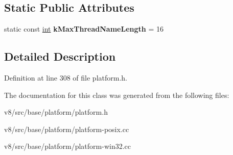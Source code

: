 \subsection*{Static Public Attributes}
\begin{DoxyCompactItemize}
\item 
\mbox{\label{classv8_1_1base_1_1Thread_add5f4a186f3af7d6781fb36847309e7e}} 
static const \mbox{\hyperlink{classint}{int}} {\bfseries k\+Max\+Thread\+Name\+Length} = 16
\end{DoxyCompactItemize}


\subsection{Detailed Description}


Definition at line 308 of file platform.\+h.



The documentation for this class was generated from the following files\+:\begin{DoxyCompactItemize}
\item 
v8/src/base/platform/platform.\+h\item 
v8/src/base/platform/platform-\/posix.\+cc\item 
v8/src/base/platform/platform-\/win32.\+cc\end{DoxyCompactItemize}
